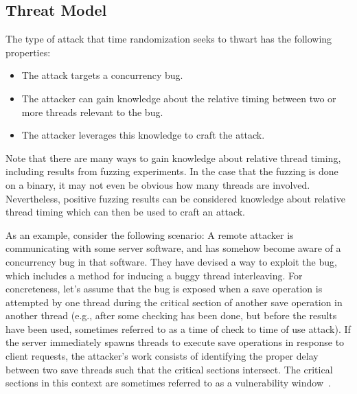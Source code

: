 \subsection{Threat Model}\label{threat-model}
The type of attack that time randomization seeks to thwart has the following properties:
\begin{itemize}
	\item The attack targets a concurrency bug.
	\item The attacker can gain knowledge about the relative timing between two
  or more threads relevant to the bug.
	\item The attacker leverages this knowledge to craft the attack.
\end{itemize}
Note that there are many ways to gain knowledge about relative thread timing, including results from fuzzing experiments.
In the case that the fuzzing is done on a binary, it may not even be obvious how many threads are involved.
Nevertheless, positive fuzzing results can be considered knowledge about relative thread timing which can then be used to craft an attack.

As an example, consider the following scenario:
A remote attacker is communicating with some server software, and has somehow become aware of a concurrency bug in that software.
They have devised a way to exploit the bug, which includes a method for inducing a buggy thread interleaving.
For concreteness, let's assume that the bug is exposed when a save operation
is attempted by one thread during the critical section of another save
operation in another thread (e.g., after some checking has been done, but before the results have been used, sometimes referred to as a time of check to time of use attack).
If the server immediately spawns threads to execute save operations in response to client requests, the attacker's work consists of identifying the proper delay between two save threads such that the critical sections intersect.
The critical sections in this context are sometimes referred to as a vulnerability window~\cite{Yang2012}.

